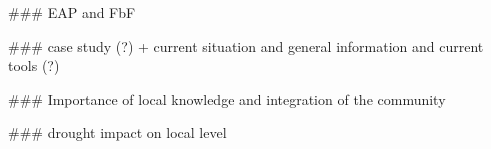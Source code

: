 


\#\#\# EAP and FbF


\#\#\# case study (?) + current situation and general information and current tools (?)



\#\#\# Importance of local knowledge and integration of the community

\#\#\# drought impact on local level




